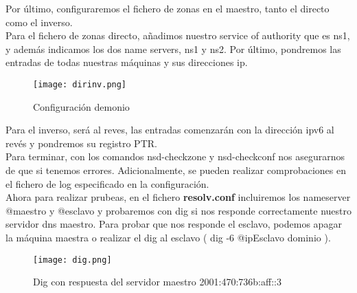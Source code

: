 \documentclass{article}
\begin{document}
Por último, configuraremos el fichero de zonas en el maestro, tanto el directo como el inverso.\\
Para el fichero de zonas directo, añadimos nuestro service of authority que es ns1, y además indicamos los dos name servers, ns1 y ns2. Por último, pondremos las entradas de todas nuestras máquinas y sus direcciones ip. 
\begin{figure}[!h]
	\centering
		\texttt{[image: dirinv.png]}
			\caption{Configuración demonio}
			\label{fig:nonflat}
\end{figure}
Para el inverso, será al reves, las entradas comenzarán con la dirección ipv6 al revés y pondremos su registro PTR.\\
\pagebreak
Para terminar, con los comandos nsd-checkzone y nsd-checkconf nos asegurarnos de que si tenemos errores. Adicionalmente, se pueden realizar comprobaciones en el fichero de log especificado en la configuración.\\
Ahora para realizar prubeas, en el fichero \textbf{resolv.conf} incluiremos los nameserver @maestro y @esclavo y probaremos con dig si nos responde correctamente nuestro servidor dns maestro. Para probar que nos responde el esclavo, podemos apagar la máquina maestra o realizar el dig al esclavo ( dig -6 @ipEsclavo dominio ). 
\begin{figure}[!h]
	\centering
		\texttt{[image: dig.png]}
			\caption{Dig con respuesta del servidor maestro 2001:470:736b:aff::3}
			\label{fig:nonflat}
\end{figure}
\end{document}
